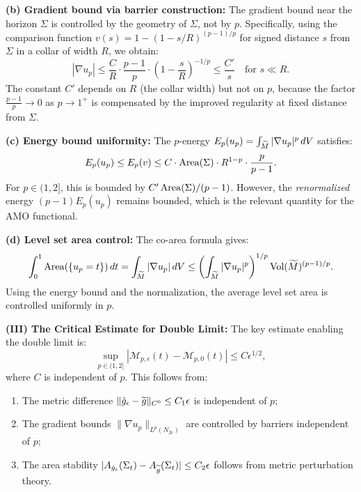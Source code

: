 \begin{remark}
\textbf{(b) Gradient bound via barrier construction:} The gradient bound near the horizon $\Sigma$ is controlled by the geometry of $\Sigma$, not by $p$. Specifically, using the comparison function $v(s) = 1 - (1 - s/R)^{(p-1)/p}$ for signed distance $s$ from $\Sigma$ in a collar of width $R$, we obtain:
\begin{equation}
    |\nabla u_p| \le \frac{C}{R} \cdot \frac{p-1}{p} \cdot \left( 1 - \frac{s}{R} \right)^{-1/p} \le \frac{C'}{s} \quad \text{for } s \ll R.
\end{equation}
The constant $C'$ depends on $R$ (the collar width) but not on $p$, because the factor $\frac{p-1}{p} \to 0$ as $p \to 1^+$ is compensated by the improved regularity at fixed distance from $\Sigma$.

\textbf{(c) Energy bound uniformity:} The $p$-energy $E_p(u_p) = \int_{\widetilde{M}} |\nabla u_p|^p \, dV$ satisfies:
\begin{equation}
    E_p(u_p) \le E_p(v) \le C \cdot \operatorname{Area}(\Sigma) \cdot R^{1-p} \cdot \frac{p}{p-1}.
\end{equation}
For $p \in (1, 2]$, this is bounded by $C' \operatorname{Area}(\Sigma) / (p-1)$. However, the \emph{renormalized} energy $(p-1) E_p(u_p)$ remains bounded, which is the relevant quantity for the AMO functional.

\textbf{(d) Level set area control:} The co-area formula gives:
\begin{equation}
    \int_0^1 \operatorname{Area}(\{u_p = t\}) \, dt = \int_{\widetilde{M}} |\nabla u_p| \, dV \le \left( \int_{\widetilde{M}} |\nabla u_p|^p \right)^{1/p} \operatorname{Vol}(\widetilde{M})^{(p-1)/p}.
\end{equation}
Using the energy bound and the normalization, the average level set area is controlled uniformly in $p$.

\textbf{(III) The Critical Estimate for Double Limit:}
The key estimate enabling the double limit is:
\begin{equation}\label{eq:CriticalUniformBound}
    \sup_{p \in (1, 2]} \left| \mathcal{M}_{p,\epsilon}(t) - \mathcal{M}_{p,0}(t) \right| \le C \epsilon^{1/2},
\end{equation}
where $C$ is independent of $p$. This follows from:
\begin{enumerate}
    \item The metric difference $\|\hat{g}_\epsilon - \widetilde{g}\|_{C^0} \le C_1 \epsilon$ is independent of $p$;
    \item The gradient bounds $\|\nabla u_p\|_{L^p(N_{2\epsilon})}$ are controlled by barriers independent of $p$;
    \item The area stability $|A_{\hat{g}_\epsilon}(\Sigma_t) - A_{\widetilde{g}}(\Sigma_t)| \le C_2 \epsilon$ follows from metric perturbation theory.
\end{enumerate}


\end{remark}
